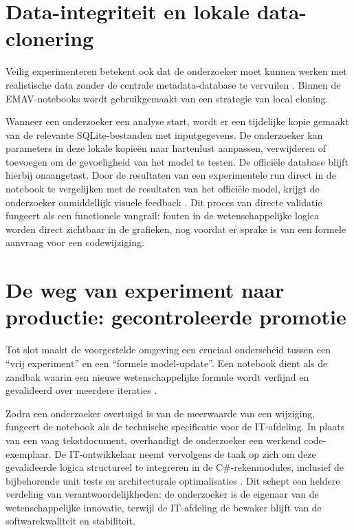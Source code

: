 \section{Data-integriteit en lokale data-clonering}
Veilig experimenteren betekent ook dat de onderzoeker moet kunnen werken met realistische data zonder de centrale metadata-database te vervuilen \autocite{Johnson1996}. Binnen de EMAV-notebooks wordt gebruikgemaakt van een strategie van local cloning.

Wanneer een onderzoeker een analyse start, wordt er een tijdelijke kopie gemaakt van de relevante SQLite-bestanden met inputgegevens. De onderzoeker kan parameters in deze lokale kopieën naar hartenlust aanpassen, verwijderen of toevoegen om de gevoeligheid van het model te testen. De officiële database blijft hierbij onaangetast. Door de resultaten van een experimentele run direct in de notebook te vergelijken met de resultaten van het officiële model, krijgt de onderzoeker onmiddellijk visuele feedback \autocite{Kohavi2020}. Dit proces van directe validatie fungeert als een functionele vangrail: fouten in de wetenschappelijke logica worden direct zichtbaar in de grafieken, nog voordat er sprake is van een formele aanvraag voor een codewijziging.

\section{De weg van experiment naar productie: gecontroleerde promotie}
Tot slot maakt de voorgestelde omgeving een cruciaal onderscheid tussen een ``vrij experiment'' en een ``formele model-update''. Een notebook dient als de zandbak waarin een nieuwe wetenschappelijke formule wordt verfijnd en gevalideerd over meerdere iteraties \autocite{Tamburri2020}.

Zodra een onderzoeker overtuigd is van de meerwaarde van een wijziging, fungeert de notebook als de technische specificatie voor de IT-afdeling. In plaats van een vaag tekstdocument, overhandigt de onderzoeker een werkend code-exemplaar. De IT-ontwikkelaar neemt vervolgens de taak op zich om deze gevalideerde logica structureel te integreren in de C\#-rekenmodules, inclusief de bijbehorende unit tests en architecturale optimalisaties \autocite{Bosch2021}. Dit schept een heldere verdeling van verantwoordelijkheden: de onderzoeker is de eigenaar van de wetenschappelijke innovatie, terwijl de IT-afdeling de bewaker blijft van de softwarekwaliteit en stabiliteit.

